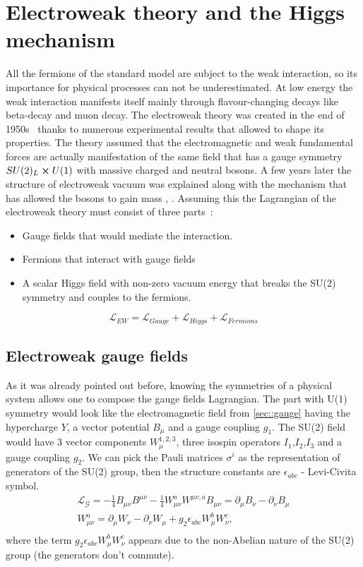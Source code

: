 \section{Electroweak theory and the Higgs mechanism}
All the fermions of the standard model are subject to the weak interaction, so its importance for physical processes can not be underestimated. At low energy the weak interaction manifests itself mainly through flavour-changing decays like beta-decay and muon decay. The electroweak theory was created in the end of 1950s~\cite{Glashow:1959wxa} \cite{weinberg} \cite{Salam1959} thanks to numerous experimental results that allowed to shape its properties. The theory assumed that the electromagnetic and weak fundamental forces are actually manifestation of the same field that has a gauge symmetry $SU(2)_L \cross U(1)$ with massive charged and neutral bosons. A few years later the structure of electroweak vacuum was explained along with the mechanism that has allowed the bosons to gain mass \cite{brout}, \cite{higgs}. Assuming this the Lagrangian of the electroweak theory must consist of three parts~\cite{Hollik_2006}: 
\begin{itemize}
	\item Gauge fields that would mediate the interaction.
	\item Fermions that interact with gauge fields
	\item A scalar Higgs field with non-zero vacuum energy that breaks the SU(2) symmetry and couples to the fermions.
\end{itemize}
 \begin{equation}
\mathcal{L}_{EW} = \mathcal{L}_{Gauge} +\mathcal{L}_{Higgs} +\mathcal{L}_{Fermions}
\end{equation}
\subsection{Electroweak gauge fields}
\label{sec::ewk}
As it was already pointed out before, knowing the symmetries of a physical system allows one to compose the gauge fields Lagrangian. The part with U(1) symmetry would look like the electromagnetic field from \ref{sec::gauge} having the hypercharge $Y$, a vector potential $B_{\mu}$ and a gauge coupling $g_1$. The SU(2) field would have 3 vector components $W^{1,2,3}_{\mu}$, three isospin operators $I_1$,$I_2$,$I_3$ and a gauge coupling $g_2$. We can pick the Pauli matrices $\sigma^{i}$ as the representation of generators of the SU(2) group, then the structure constants are $\epsilon_{abc}$ - Levi-Civita symbol.
\begin{equation}
\begin{array}{lcl} 
\mathcal{L_{G}} =  -\frac{1}{4}B_{\mu \nu}B^{\mu \nu} -\frac{1}{4}W^a_{\mu \nu}W^{\mu \nu,a} 
B_{\mu \nu}  =\partial_{\mu}B_{\nu} - \partial_{\nu}B_{\mu}\\ 
W^a_{\mu \nu}  =\partial_{\mu}W_{\nu} - \partial_{\nu}W_{\mu}+g_2\epsilon_{abc}W^b_{\mu}W^c_{\nu},\\ 
\end{array} 
\end{equation}
where the term $g_2\epsilon_{abc}W^b_{\mu}W^c_{\nu}$ appears due to the non-Abelian nature of the SU(2) group (the generators don't commute).


